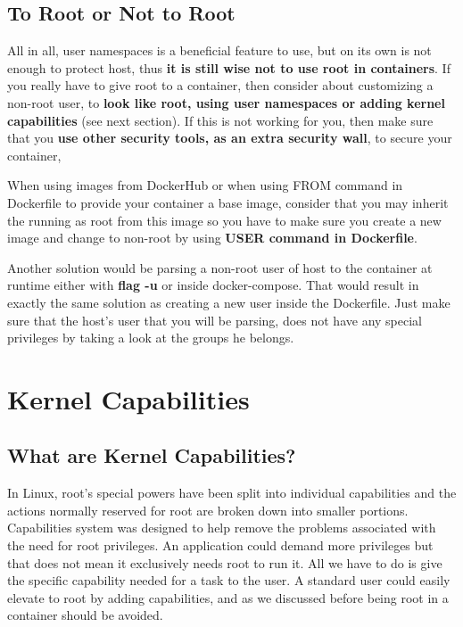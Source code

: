 \subsection{To Root or Not to Root}
All in all, user namespaces is a beneficial feature to use, but on its own is not enough to protect host, thus \textbf{it is still wise not to use root in containers}. If you really have to give root to a container, then consider about customizing a non-root user, to \textbf{look like root, using user namespaces or adding kernel capabilities} (see next section). If this is not working for you, then make sure that you \textbf{use other security tools, as an extra security wall}, to secure your container, 

\begin{mdframed}[backgroundcolor=navajowhite]
When using images from DockerHub or when using FROM command in Dockerfile to provide your container a base image, consider that you may inherit the running as root from this image so you have to make sure you create a new image and change to non-root by using \textbf{USER command in Dockerfile}.

Another solution would be parsing a non-root user of host to the container at runtime either with \textbf{flag -u} or inside docker-compose. That would result in exactly the same solution as creating a new user inside the Dockerfile. Just make sure that the host's user that you will be parsing, does not have any special privileges by taking a look at the groups he belongs.
\end{mdframed}

\section{Kernel Capabilities} \label{kernelcaps}
\subsection{What are Kernel Capabilities?}
In Linux, root's special powers have been split into individual capabilities and the actions normally reserved for root are broken down into smaller portions. Capabilities system was designed to help remove the problems associated with the need for root privileges. An application could demand more privileges but that does not mean it exclusively needs root to run it. All we have to do is give the specific capability needed for a task to the user. 
A standard user could easily elevate to root by adding capabilities, and as we discussed before being root in a container should be avoided.

